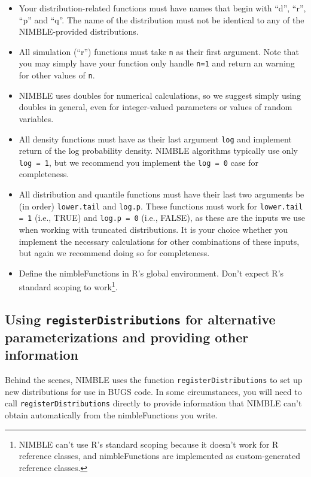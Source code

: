 \documentclass[12pt,oneside]{book}\usepackage[]{graphicx}\usepackage[]{color}
\def\cd#1{\texttt{#1}}
\begin{document}
\begin{itemize}
\item Your distribution-related functions must have names that begin with ``d'', ``r'', ``p'' and ``q''. The name of the distribution must not be identical to any of the NIMBLE-provided distributions.
\item All simulation (``r'') functions must take \cd{n} as their first argument. Note that you may simply have your function only handle \cd{n=1} and return an warning for other values of \cd{n}.
\item NIMBLE uses doubles for numerical calculations, so we suggest simply using doubles in general, even for integer-valued parameters or values of random variables.
  \item All density functions must have as their last argument \cd{log} and implement return of the log probability density. NIMBLE algorithms typically use only \cd{log = 1}, but we recommend you implement the \cd{log = 0} case for completeness. 
  \item All distribution and quantile functions must have their last two arguments be (in order) \cd{lower.tail} and \cd{log.p}. These functions must work for \cd{lower.tail = 1} (i.e., TRUE) and \cd{log.p = 0} (i.e., FALSE), as these are the inputs we use when working with truncated distributions. It is your choice whether you implement the necessary calculations for other combinations of these inputs, but again we recommend doing so for completeness.
  \item Define the nimbleFunctions in R's global environment.  Don't expect R's standard scoping to work\footnote{NIMBLE can't use R's standard scoping because it doesn't work for R reference classes, and nimbleFunctions are implemented as custom-generated reference classes.}.
\end{itemize}

\subsection{Using \cd{registerDistributions} for alternative
  parameterizations and providing other information}
\label{sec:registerDistributions}

Behind the scenes, NIMBLE uses the function
\cd{registerDistributions} to set up new distributions for use in BUGS
code. In some circumstances, you will need to call
\cd{registerDistributions} directly to provide information that NIMBLE
can't obtain automatically from the nimbleFunctions you write. 
\end{document}
